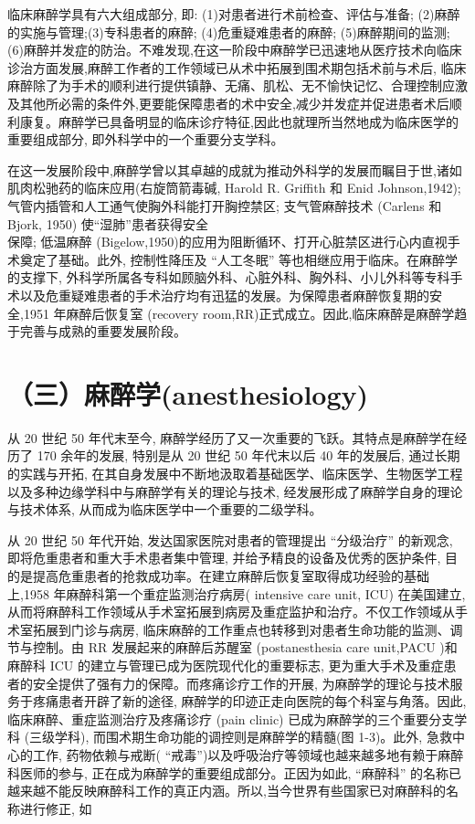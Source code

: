 \documentclass[10pt]{article}
\begin{document}
临床麻醉学具有六大组成部分, 即: (1)对患者进行术前检查、评估与准备; (2)麻醉的实施与管理;(3)专科患者的麻醉; (4)危重疑难患者的麻醉; (5)麻醉期间的监测; (6)麻醉并发症的防治。不难发现,在这一阶段中麻醉学已迅速地从医疗技术向临床诊治方面发展,麻醉工作者的工作领域已从术中拓展到围术期包括术前与术后, 临床麻醉除了为手术的顺利进行提供镇静、无痛、肌松、无不愉快记忆、合理控制应激及其他所必需的条件外,更要能保障患者的术中安全,减少并发症并促进患者术后顺利康复。麻醉学已具备明显的临床诊疗特征,因此也就理所当然地成为临床医学的重要组成部分, 即外科学中的一个重要分支学科。

在这一发展阶段中,麻醉学曾以其卓越的成就为推动外科学的发展而瞩目于世,诸如肌肉松驰药的临床应用(右旋筒箭毒碱, Harold R. Griffith 和 Enid Johnson,1942); 气管内插管和人工通气使胸外科能打开胸控禁区; 支气管麻醉技术 (Carlens 和 Bjork, 1950) 使“湿肺”患者获得安全\\
保障; 低温麻醉 (Bigelow,1950)的应用为阻断循环、打开心脏禁区进行心内直视手术奠定了基础。此外, 控制性降压及 “人工冬眠” 等也相继应用于临床。在麻醉学的支撑下, 外科学所属各专科如顾脑外科、心脏外科、胸外科、小儿外科等专科手术以及危重疑难患者的手术治疗均有迅猛的发展。为保障患者麻醉恢复期的安全,1951 年麻醉后恢复室 (recovery room,RR)正式成立。因此,临床麻醉是麻醉学趋于完善与成熟的重要发展阶段。

\section*{（三）麻醉学(anesthesiology)}
从 20 世纪 50 年代末至今, 麻醉学经历了又一次重要的飞跃。其特点是麻醉学在经历了 170 余年的发展, 特别是从 20 世纪 50 年代末以后 40 年的发展后, 通过长期的实践与开拓, 在其自身发展中不断地汲取着基础医学、临床医学、生物医学工程以及多种边缘学科中与麻醉学有关的理论与技术, 经发展形成了麻醉学自身的理论与技术体系, 从而成为临床医学中一个重要的二级学科。

从 20 世纪 50 年代开始, 发达国家医院对患者的管理提出 “分级治疗” 的新观念, 即将危重患者和重大手术患者集中管理, 并给予精良的设备及优秀的医护条件, 目的是提高危重患者的抢救成功率。在建立麻醉后恢复室取得成功经验的基础上,1958 年麻醉科第一个重症监测治疗病房( intensive care unit, ICU) 在美国建立, 从而将麻醉科工作领域从手术室拓展到病房及重症监护和治疗。不仅工作领域从手术室拓展到门诊与病房, 临床麻醉的工作重点也转移到对患者生命功能的监测、调节与控制。由 RR 发展起来的麻醉后苏醒室 (postanesthesia care unit,PACU )和麻醉科 ICU 的建立与管理已成为医院现代化的重要标志, 更为重大手术及重症患者的安全提供了强有力的保障。而疼痛诊疗工作的开展, 为麻醉学的理论与技术服务于疼痛患者开辟了新的途径, 麻醉学的印迹正走向医院的每个科室与角落。因此,临床麻醉、重症监测治疗及疼痛诊疗 (pain clinic) 已成为麻醉学的三个重要分支学科 (三级学科), 而围术期生命功能的调控则是麻醉学的精髓(图 1-3)。此外, 急救中心的工作, 药物依赖与戒断( “戒毒”)以及呼吸治疗等领域也越来越多地有赖于麻醉科医师的参与, 正在成为麻醉学的重要组成部分。正因为如此, “麻醉科” 的名称已越来越不能反映麻醉科工作的真正内涵。所以,当今世界有些国家已对麻醉科的名称进行修正, 如
\end{document}
